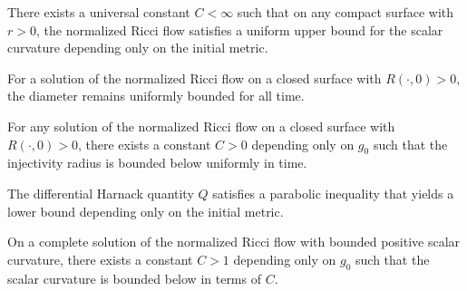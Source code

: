 \begin{proposition}
\label{ch05-prop-uniform-curvature-bound-positive}
There exists a universal constant \(C<\infty\) such that on any compact surface with \(r>0\), the normalized Ricci flow satisfies a uniform upper bound for the scalar curvature depending only on the initial metric.
\end{proposition}

\begin{proposition}
\label{ch05-prop-diameter-bound-positive}
For a solution of the normalized Ricci flow on a closed surface with \(R(\cdot,0)>0\), the diameter remains uniformly bounded for all time.
\end{proposition}

\begin{corollary}
\label{ch05-cor-injectivity-radius-control}
For any solution of the normalized Ricci flow on a closed surface with \(R(\cdot,0)>0\), there exists a constant \(C>0\) depending only on \(g_0\) such that the injectivity radius is bounded below uniformly in time.
\end{corollary}

\begin{corollary}
\label{ch05-cor-differential-harnack}
The differential Harnack quantity \(Q\) satisfies a parabolic inequality that yields a lower bound depending only on the initial metric.
\end{corollary}

\begin{proposition}
\label{ch05-prop-positive-curvature-lower-bound}
On a complete solution of the normalized Ricci flow with bounded positive scalar curvature, there exists a constant \(C>1\) depending only on \(g_0\) such that the scalar curvature is bounded below in terms of \(C\).
\end{proposition}

